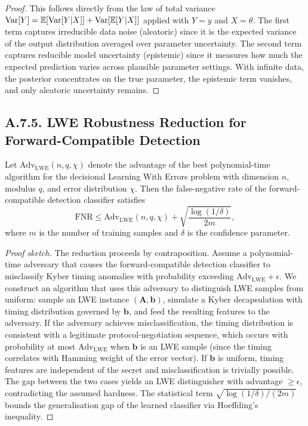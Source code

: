 \begin{proof}
This follows directly from the law of total variance $\mathrm{Var}[Y]=\mathbb{E}[\mathrm{Var}[Y|X]]+\mathrm{Var}[\mathbb{E}[Y|X]]$ applied with $Y=y$ and $X=\theta$. The first term captures irreducible data noise (aleatoric) since it is the expected variance of the output distribution averaged over parameter uncertainty. The second term captures reducible model uncertainty (epistemic) since it measures how much the expected prediction varies across plausible parameter settings. With infinite data, the posterior concentrates on the true parameter, the epistemic term vanishes, and only aleatoric uncertainty remains.
\end{proof}


\subsection*{A.7.5. LWE Robustness Reduction for Forward-Compatible Detection}
\label{app:lwe_reduction}

\begin{proposition}
\label{prop:lwe}
Let $\mathrm{Adv}_{\mathrm{LWE}}(n,q,\chi)$ denote the advantage of the best polynomial-time algorithm for the decisional Learning With Errors problem with dimension $n$, modulus $q$, and error distribution $\chi$. Then the false-negative rate of the forward-compatible detection classifier satisfies
\begin{equation}
\mathrm{FNR} \le \mathrm{Adv}_{\mathrm{LWE}}(n,q,\chi) + \sqrt{\frac{\log(1/\delta)}{2m}},
\end{equation}
where $m$ is the number of training samples and $\delta$ is the confidence parameter.
\end{proposition}

\begin{proof}[Proof sketch]
The reduction proceeds by contraposition. Assume a polynomial-time adversary that causes the forward-compatible detection classifier to misclassify Kyber timing anomalies with probability exceeding $\mathrm{Adv}_{\mathrm{LWE}}+\epsilon$. We construct an algorithm that uses this adversary to distinguish LWE samples from uniform: sample an LWE instance $(\mathbf{A},\mathbf{b})$, simulate a Kyber decapsulation with timing distribution governed by $\mathbf{b}$, and feed the resulting features to the adversary. If the adversary achieves misclassification, the timing distribution is consistent with a legitimate protocol-negotiation sequence, which occurs with probability at most $\mathrm{Adv}_{\mathrm{LWE}}$ when $\mathbf{b}$ is an LWE sample (since the timing correlates with Hamming weight of the error vector). If $\mathbf{b}$ is uniform, timing features are independent of the secret and misclassification is trivially possible. The gap between the two cases yields an LWE distinguisher with advantage $\ge\epsilon$, contradicting the assumed hardness. The statistical term $\sqrt{\log(1/\delta)/(2m)}$ bounds the generalisation gap of the learned classifier via Hoeffding's inequality.
\end{proof}


